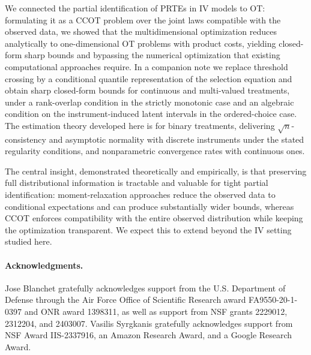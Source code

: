 We connected the partial identification of PRTEs in IV models to OT: formulating it as a CCOT problem over the joint laws compatible with the observed data, we showed that the multidimensional optimization reduces analytically to one-dimensional OT problems with product costs, yielding closed-form sharp bounds and bypassing the numerical optimization that existing computational approaches require. In a companion note we replace threshold crossing by a conditional quantile representation of the selection equation and obtain sharp closed-form bounds for continuous and multi-valued treatments, under a rank-overlap condition in the strictly monotonic case and an algebraic condition on the instrument-induced latent intervals in the ordered-choice case. The estimation theory developed here is for binary treatments, delivering $\sqrt{n}$-consistency and asymptotic normality with discrete instruments under the stated regularity conditions, and nonparametric convergence rates with continuous ones.

The central insight, demonstrated theoretically and empirically, is that preserving full distributional information is tractable and valuable for tight partial identification: moment-relaxation approaches reduce the observed data to conditional expectations and can produce substantially wider bounds, whereas CCOT enforces compatibility with the entire observed distribution while keeping the optimization transparent. We expect this to extend beyond the IV setting studied here.


\paragraph{Acknowledgments.} Jose Blanchet gratefully acknowledges support from the U.S. Department of Defense through the Air Force Office of Scientific Research award FA9550-20-1-0397 and ONR award 1398311, as well as support from NSF grants 2229012, 2312204, and 2403007.
Vasilis Syrgkanis gratefully acknowledges support from NSF Award IIS-2337916, an Amazon Research Award, and a Google Research Award.

